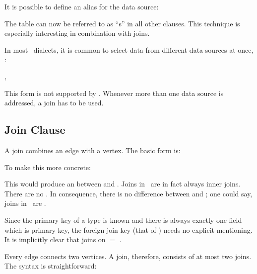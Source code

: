 It is possible to define an alias for the data source:

   

The table  can now be referred to as ``s''
in all other clauses.
This technique is especially interesting in combination
with joins.

In most \sql\ dialects,
it is common to select data from different
data sources at once, \eg:

 , 

This form is not supported by \nowdb.
Whenever more than one data source is addressed,
a join has to be used.

\subsection{Join Clause}
A join combines an edge with a vertex.
The basic form is:

   

To make this more concrete:

  
   

This would produce an  
between  and .
Joins in \nowdb\ are in fact always inner joins.
There are no . 
In consequence, there is no difference between
 and ; one could say,
joins in \nowdb\ are .

Since the primary key of a type is known
and there is always exactly one field
which is primary key, the foreign join key
(that of ) needs no
explicit mentioning. It is implicitly clear 
that   
joins on  $=$ .

Every edge connects two vertices.
A join, therefore, consists of at most two joins.
The syntax is straightforward:

